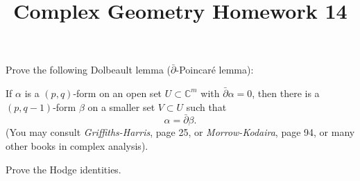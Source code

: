 \documentclass[12pt]{article}
\title{Complex Geometry Homework 14}
\author{}
\date{}
\begin{document}
\maketitle
\begin{problem}
  Prove the following Dolbeault lemma (\(\bar{\partial}\)-Poincaré lemma):

  If \(\alpha\) is a \((p,q)\)-form on an open set \(U\subset \mathbb{C}^m\) with
  \(\bar{\partial}\alpha=0\), then there is a \((p,q-1)\)-form \(\beta\) on a smaller
  set \(V\subset U\) such that \[
    \alpha=\bar{\partial}\beta
  .\] (You may consult \emph{Griffiths-Harris}, page 25, or \emph{Morrow-Kodaira},
  page 94, or many other books in complex analysis).
\end{problem}
\begin{problem}
  Prove the Hodge identities.
\end{problem}
\end{document}
